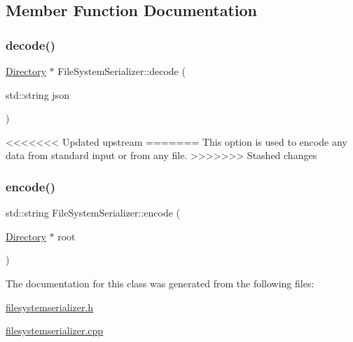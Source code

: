 \subsection{Member Function Documentation}
\mbox{\label{class_file_system_serializer_a9a32306fcb9133696c1b5f795eaa1933}} 
\subsubsection{\texorpdfstring{decode()}{decode()}}
{\footnotesize\ttfamily \hyperlink{class_directory}{Directory} $\ast$ File\+System\+Serializer\+::decode (\begin{DoxyParamCaption}\item[{std\+::string}]{json }\end{DoxyParamCaption})\hspace{0.3cm}{\ttfamily [static]}}

<<<<<<< Updated upstream
\mbox{\label{class_file_system_serializer_aef096d9b5936bddd4beac3dc9181c28f}} 
=======
This option is used to encode any data from standard input or from any file. \mbox{\label{class_file_system_serializer_aef096d9b5936bddd4beac3dc9181c28f}} 
>>>>>>> Stashed changes
\subsubsection{\texorpdfstring{encode()}{encode()}}
{\footnotesize\ttfamily std\+::string File\+System\+Serializer\+::encode (\begin{DoxyParamCaption}\item[{\hyperlink{class_directory}{Directory} $\ast$}]{root }\end{DoxyParamCaption})\hspace{0.3cm}{\ttfamily [static]}}



The documentation for this class was generated from the following files\+:\begin{DoxyCompactItemize}
\item 
\hyperlink{filesystemserializer_8h}{filesystemserializer.\+h}\item 
\hyperlink{filesystemserializer_8cpp}{filesystemserializer.\+cpp}\end{DoxyCompactItemize}

